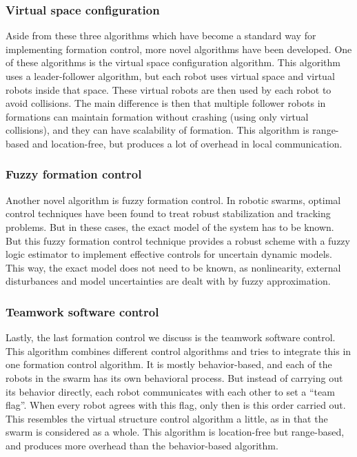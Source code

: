 \subsubsection{Virtual space configuration}
Aside from these three algorithms which have become a standard way for implementing formation control, more novel algorithms have been developed. 
One of these algorithms is the virtual space configuration algorithm. \cite{wee2013formation}
This algorithm uses a leader-follower algorithm, but each robot uses virtual space and virtual robots inside that space.
These virtual robots are then used by each robot to avoid collisions. 
The main difference is then that multiple follower robots in formations can maintain formation without crashing (using only virtual collisions), and they can have scalability of formation. 
This algorithm is range-based and location-free, but produces a lot of overhead in local communication.

\subsubsection{Fuzzy formation control}
Another novel algorithm is fuzzy formation control.\cite{ranjbar2012novel}
In robotic swarms, optimal control techniques have been found to treat robust stabilization and tracking problems. 
But in these cases, the exact model of the system has to be known. 
But this fuzzy formation control technique provides a robust scheme with a fuzzy logic estimator to implement effective controls for uncertain dynamic models.
This way, the exact model does not need to be known, as nonlinearity, external disturbances and model uncertainties are dealt with by fuzzy approximation.

\subsubsection{Teamwork software control}
Lastly, the last formation control we discuss is the teamwork software control. \cite{kaminka2013use}
This algorithm combines different control algorithms and tries to integrate this in one formation control algorithm.
It is mostly behavior-based, and each of the robots in the swarm has its own behavioral process. 
But instead of carrying out its behavior directly, each robot communicates with each other to set a ``team flag''. 
When every robot agrees with this flag, only then is this order carried out. 
This resembles the virtual structure control algorithm a little, as in that the swarm is considered as a whole. 
This algorithm is location-free but range-based, and produces more overhead than the behavior-based algorithm.

